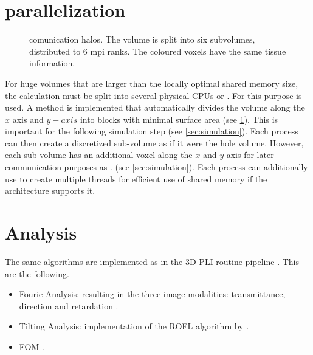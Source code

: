 \section{\mpi{} parallelization}\label{sec:mpiSim}
\begin{figure}[!t]
\centering
\def\tikzwidth{0.75\textwidth}
\caption{comunication halos. The volume is split into six subvolumes, distributed to 6 mpi ranks. The coloured voxels have the same tissue information.}
\label{fig:com_halo}
\end{figure}
% 
For huge volumes that are larger than the locally optimal shared memory size, the calculation must be split into several physical \acp{CPU} or .
For this purpose \mpi{} is used.
A method is implemented that automatically divides the volume along the $x$ axis and $y- axis$ into blocks with minimal surface area (see \cref{fig:com_halo}).
This is important for the following simulation step (see \cref{sec:simulation}).
Each \mpi{} process can then create a discretized sub-volume as if it were the hole volume.
However, each sub-volume has an additional voxel along the $x$ and $y$ axis for later communication purposes as . (see \cref{sec:simulation}).
Each \mpi{} process can additionally use \openmp{} to create multiple threads for efficient use of shared memory if the architecture supports it.
% 
% 
% 
\section{Analysis}
% 
The same algorithms are implemented as in the \ac{3D-PLI} routine pipeline \dummy[-> theory]{}.
This are the following.
% 
\begin{itemize}
  \item Fourie Analysis: resulting in the three image modalities: transmittance, direction and retardation \dummy{}. 
  \item Tilting Analysis: implementation of the \ac{ROFL} algorithm by \cite{Schmitz2018} \dummy{}. 
  \item \ac{FOM} \dummy{}. 
\end{itemize}
% 
% 
